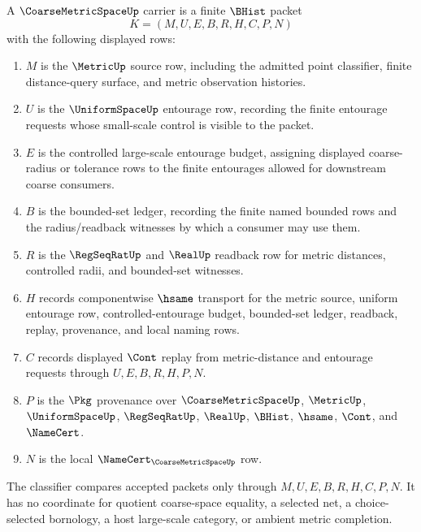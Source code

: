 \begin{definition}
\label{def:coarse-metric-space-carrier}
A $\CoarseMetricSpaceUp$ carrier is a finite $\BHist$ packet
$$
K=(M,U,E,B,R,H,C,P,N)
$$
with the following displayed rows:
\begin{enumerate}
\item $M$ is the $\MetricUp$ source row, including the admitted point classifier, finite distance-query surface, and metric observation histories.
\item $U$ is the $\UniformSpaceUp$ entourage row, recording the finite entourage requests whose small-scale control is visible to the packet.
\item $E$ is the controlled large-scale entourage budget, assigning displayed coarse-radius or tolerance rows to the finite entourages allowed for downstream coarse consumers.
\item $B$ is the bounded-set ledger, recording the finite named bounded rows and the radius/readback witnesses by which a consumer may use them.
\item $R$ is the $\RegSeqRatUp$ and $\RealUp$ readback row for metric distances, controlled radii, and bounded-set witnesses.
\item $H$ records componentwise $\hsame$ transport for the metric source, uniform entourage row, controlled-entourage budget, bounded-set ledger, readback, replay, provenance, and local naming rows.
\item $C$ records displayed $\Cont$ replay from metric-distance and entourage requests through $U,E,B,R,H,P,N$.
\item $P$ is the $\Pkg$ provenance over $\CoarseMetricSpaceUp$, $\MetricUp$, $\UniformSpaceUp$, $\RegSeqRatUp$, $\RealUp$, $\BHist$, $\hsame$, $\Cont$, and $\NameCert$.
\item $N$ is the local $\NameCert_{\CoarseMetricSpaceUp}$ row.
\end{enumerate}
The classifier compares accepted packets only through $M,U,E,B,R,H,C,P,N$. It has no coordinate for quotient coarse-space equality, a selected net, a choice-selected bornology, a host large-scale category, or ambient metric completion.
\end{definition}

